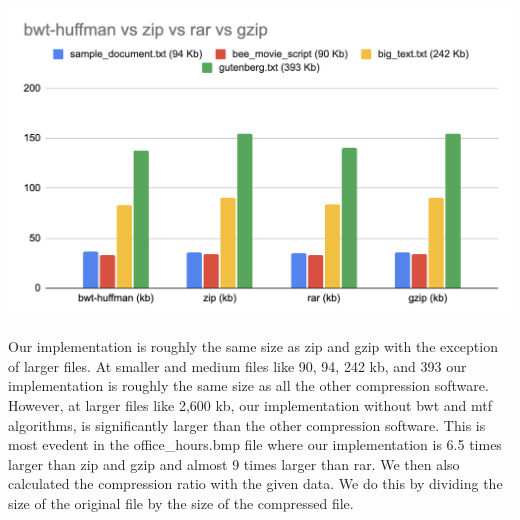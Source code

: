 \documentclass[12pt,letterpaper]{article}
\begin{document}
\begin{center}
    \includegraphics[scale=.5]{./images/chart1.png}
\end{center}


Our implementation is roughly the same size as zip and gzip with the exception of larger files.
At smaller and medium files like 90, 94, 242 kb, and 393 our implementation is roughly the same size
as all the other compression software. However, at larger files like 2,600 kb, our implementation without bwt and mtf algorithms,
is significantly larger than the other compression software. This is most evedent in the office\_hours.bmp file
where our implementation is 6.5 times larger than zip and gzip and almost 9 times larger than rar. 
We then also calculated the compression ratio with the given data. We do this by dividing the size of the original file by the size of the compressed file.
\end{document}
